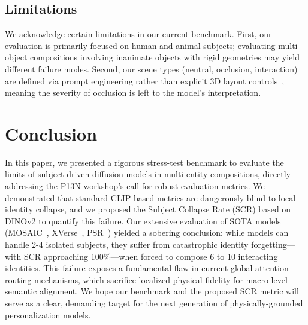 \subsection{Limitations}
We acknowledge certain limitations in our current benchmark. First, our evaluation is primarily focused on human and animal subjects; evaluating multi-object compositions involving inanimate objects with rigid geometries may yield different failure modes. Second, our scene types (neutral, occlusion, interaction) are defined via prompt engineering rather than explicit 3D layout controls~\cite{contextgen2024,anyms2024}, meaning the severity of occlusion is left to the model's interpretation.

\section{Conclusion}

In this paper, we presented a rigorous stress-test benchmark to evaluate the limits of subject-driven diffusion models in multi-entity compositions, directly addressing the P13N workshop's call for robust evaluation metrics. We demonstrated that standard CLIP-based metrics are dangerously blind to local identity collapse, and we proposed the Subject Collapse Rate (SCR) based on DINOv2 to quantify this failure. Our extensive evaluation of SOTA models (MOSAIC~\cite{mosaic2024}, XVerse~\cite{xverse2024}, PSR~\cite{psr2024}) yielded a sobering conclusion: while models can handle 2-4 isolated subjects, they suffer from catastrophic identity forgetting—with SCR approaching 100\%—when forced to compose 6 to 10 interacting identities. This failure exposes a fundamental flaw in current global attention routing mechanisms, which sacrifice localized physical fidelity for macro-level semantic alignment. We hope our benchmark and the proposed SCR metric will serve as a clear, demanding target for the next generation of physically-grounded personalization models.
